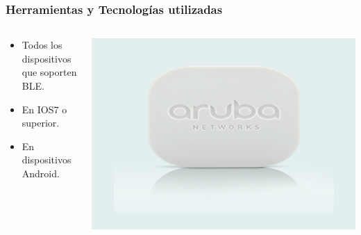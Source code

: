 \begin{frame}
	\frametitle{Herramientas y Tecnologías utilizadas}
	\begin{columns}
			\begin{column}{0.6\textwidth}
					\begin{itemize}
						\item {Todos los dispositivos que soporten BLE.}
						\item {En IOS7 o superior.}
						\item {En dispositivos Android.}
					\end{itemize}
				\endblock{}
			\end{column}
			\begin{column}{0.4\textwidth}
				\vfill 
					\begin{center}
						\includegraphics[width=0.8\linewidth]{Images/arubaBeacons}
					\end{center}
			\end{column}
	\end{columns}
\end{frame}


